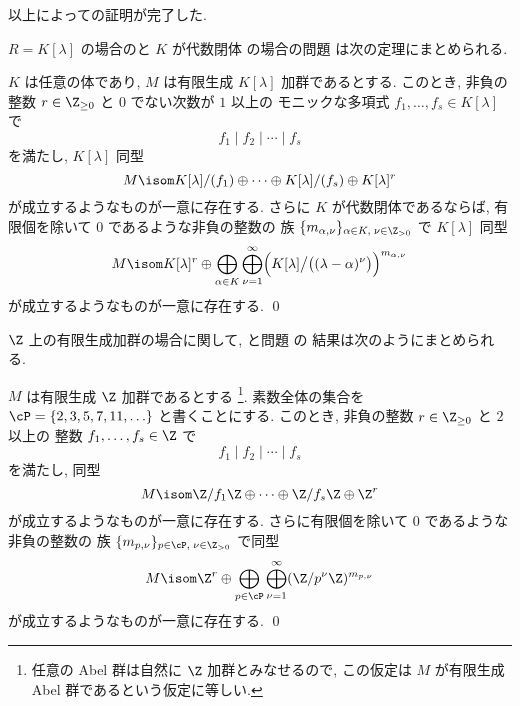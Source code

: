 \documentclass[12pt,twoside]{jarticle}
\begin{document}
\medskip

以上によっての証明が完了した.

$R=K[\lambda]$ の場合のと $K$ が代数閉体
の場合の問題  は次の定理にまとめられる.

\begin{theorem}
\label{theorem:fg-K[x]-modules}
  $K$ は任意の体であり, $M$ は有限生成 $K[\lambda]$ 加群であるとする.
  このとき, 非負の整数 $r\in\Z_{\ge0}$ と $0$ でない次数が $1$ 以上の
  モニックな多項式 $f_1,\dots,f_s\in K[\lambda]$ で
  \begin{equation*}
    f_1\mid f_2\mid\cdots\mid f_s
  \end{equation*}
  を満たし, $K[\lambda]$ 同型
  \begin{equation*}
    M \isom 
    K[\lambda]/(f_1)\oplus\cdots\oplus K[\lambda]/(f_s)
    \oplus K[\lambda]^r
  \end{equation*}
  が成立するようなものが一意に存在する.  
  さらに $K$ が代数閉体であるならば,
  有限個を除いて $0$ であるような非負の整数の
  族 $\{m_{\alpha,\nu}\}_{\alpha\in K,\;\nu\in\Z_{>0}}$ で $K[\lambda]$ 同型
  \begin{equation*}
    M \isom 
    K[\lambda]^r\oplus
    \bigoplus_{\alpha\in K}\bigoplus_{\nu=1}^\infty
    \Bigl(
      K[\lambda]\big/\bigl((\lambda-\alpha)^\nu\bigr)
    \Bigr)^{m_{\alpha,\nu}}
  \end{equation*}
  が成立するようなものが一意に存在する.
  \qed
\end{theorem}


$\Z$ 上の有限生成加群の場合に関して,
と問題  の
結果は次のようにまとめられる.

\begin{theorem}
\label{theorem:fg-Z-modules}
  $M$ は有限生成 $\Z$ 加群であるとする%
  \footnote{任意の Abel 群は自然に $\Z$ 加群とみなせるので, 
    この仮定は $M$ が有限生成 Abel 群であるという仮定に等しい.}.
  素数全体の集合を $\cP=\{2,3,5,7,11,\ldots\}$ と書くことにする.
  このとき, 非負の整数 $r\in\Z_{\ge0}$ と $2$ 以上の
  整数 $f_1,\dots,f_s\in\Z$ で
  \begin{equation*}
    f_1\mid f_2\mid\cdots\mid f_s
  \end{equation*}
  を満たし, 同型
  \begin{equation*}
    M \isom \Z/f_1\Z\oplus\cdots\oplus\Z/f_s\Z\oplus\Z^r
  \end{equation*}
  が成立するようなものが一意に存在する.  
  さらに有限個を除いて $0$ であるような非負の整数の
  族 $\{m_{p,\nu}\}_{p\in\cP,\;\nu\in\Z_{>0}}$ で同型
  \begin{equation*}
    M \isom 
    \Z^r\oplus
    \bigoplus_{p\in\cP}\bigoplus_{\nu=1}^\infty (\Z/p^\nu\Z)^{m_{p,\nu}}
  \end{equation*}
  が成立するようなものが一意に存在する.
  \qed
\end{theorem}
\end{document}
